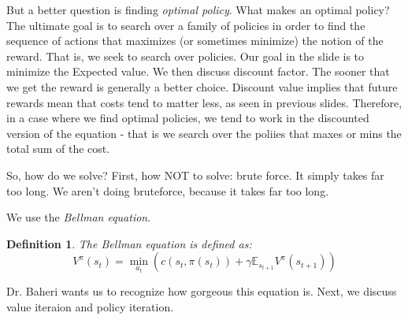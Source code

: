 \documentclass[10pt, oneside]{article}
\newtheorem{defn}{Definition}
\theoremstyle{definition}
\begin{document}
But a better question is finding \textit{optimal policy}. What makes an optimal policy? The ultimate goal is to search over a family of policies in order to find the sequence of actions that maximizes (or sometimes minimize) the notion of the reward. That is, we seek to search over policies. Our goal in the slide is to minimize the Expected value. We then discuss discount factor. The sooner that we get the reward is generally a better choice. Discount value implies that future rewards mean that costs tend to matter less, as seen in previous slides. Therefore, in a case where we find optimal policies, we tend to work in the discounted version of the equation - that is we search over the poliies that maxes or mins the total sum of the cost.

So, how do we solve?
First, how NOT to solve: brute force. It simply takes far too long. We aren't doing bruteforce, because it takes far too long. 

We use the \textit{Bellman equation}.
\begin{defn}
    The Bellman equation is defined as:
    \[V^{\pi}(s_t) = \min_{a_t}(c(s_t, \pi(s_t)) + \gamma \mathbb{E}_{s_{t+1}} V^\pi(s_{t+1}))\]
    
\end{defn}
Dr. Baheri wants us to recognize how gorgeous this equation is. Next, we discuss value iteraion and policy iteration.
\end{document}
